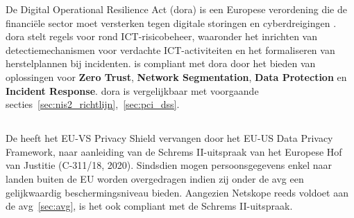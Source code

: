 De Digital Operational Resilience Act (\gls{dora}) is een Europese verordening die de financiële sector moet versterken tegen digitale storingen en cyberdreigingen \autocite{EIOPA2025}.
\gls{dora} stelt regels voor rond ICT-risicobeheer, waaronder het inrichten van detectiemechanismen voor verdachte ICT-activiteiten en het formaliseren van herstelplannen bij incidenten.
\textcite{NetskopeCompliance2025} is compliant met \gls{dora} door het bieden van oplossingen voor \textbf{Zero Trust}, \textbf{Network Segmentation}, \textbf{Data Protection} en \textbf{Incident Response}.
\gls{dora} is vergelijkbaar met voorgaande secties~\ref{sec:nis2_richtlijn},~\ref{sec:pci_dss}.


\subsection{}
\label{sec:schrems_ii}

De \textcite{EuropeanCommission2023} heeft het EU-VS Privacy Shield vervangen door het EU-US Data Privacy Framework, naar aanleiding van de Schrems II-uitspraak van het Europese Hof van Justitie (C-311/18, 2020).
Sindsdien mogen persoonsgegevens enkel naar landen buiten de EU worden overgedragen indien zij onder de \gls{avg} een gelijkwaardig beschermingsniveau bieden.
Aangezien Netskope reeds voldoet aan de \gls{avg}~\ref{sec:avg}, is het ook compliant met de Schrems II-uitspraak.




